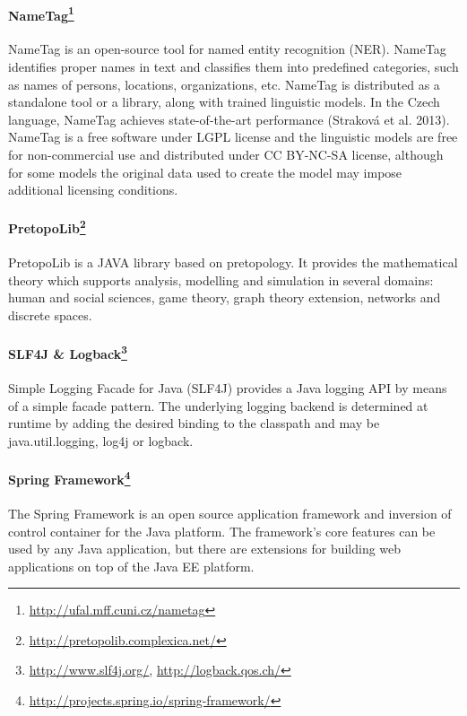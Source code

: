 \paragraph{NameTag\footnote{\url{http://ufal.mff.cuni.cz/nametag}}}
NameTag is an open-source tool for named entity recognition (NER). NameTag 
identifies proper names in text and classifies them into predefined categories,
such as names of persons, locations, organizations, etc. NameTag is distributed
as a standalone tool or a library, along with trained linguistic models.
In the Czech language, NameTag achieves state-of-the-art performance
(Straková et al. 2013). NameTag is a free software under LGPL license and the 
linguistic models are free for non-commercial use and distributed under CC 
BY-NC-SA license, although for some models the original data used to create
the model may impose additional licensing conditions.


\paragraph{PretopoLib\footnote{\url{http://pretopolib.complexica.net/}}}
PretopoLib is a JAVA library based on pretopology. It provides the mathematical 
theory which supports
analysis, modelling and simulation in several domains: human and social sciences,
game theory, graph theory extension, networks and discrete spaces.

\paragraph{SLF4J \& Logback\footnote{\url{http://www.slf4j.org/}, \url{http://logback.qos.ch/}}}
Simple Logging Facade for Java (SLF4J) provides a Java logging API by means
of a simple facade pattern. The underlying logging backend is determined
at runtime by adding the desired binding to the classpath and may be
java.util.logging, log4j or logback.

\paragraph{Spring Framework\footnote{\url{http://projects.spring.io/spring-framework/}}}
The Spring Framework is an open source application framework and inversion
of control container for the Java platform. The framework's core features
can be used by any Java application, but there are extensions for building
web applications on top of the Java EE platform.


